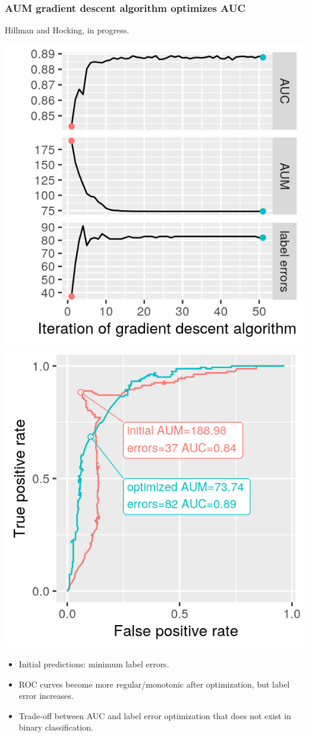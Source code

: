 \documentclass{beamer}
\begin{document}
\begin{frame}
  \frametitle{AUM gradient descent algorithm optimizes AUC}
  
  Hillman and Hocking, in progress.

  \includegraphics[width=0.49\linewidth]{figure-aum-optimized-iterations-emph}
  \includegraphics[width=0.49\linewidth]{figure-aum-train-pred-only} 

  \begin{itemize}
  \item Initial predictions: minimum label errors.
  \item ROC curves become more regular/monotonic after optimization,
    but label error increases.
  \item Trade-off between AUC and label error optimization that does
    not exist in binary classification.
  \end{itemize}
\end{frame}
\end{document}
